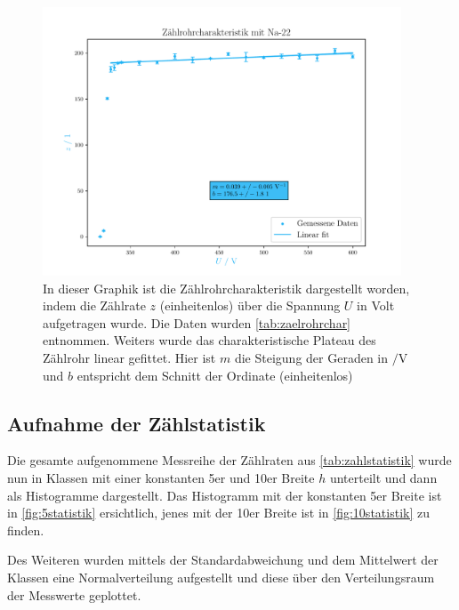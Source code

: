 \documentclass[12pt,english,ngerman]{scrartcl}
\begin{document}
\begin{figure}[H]
	\begin{center}
		\includegraphics[width = 0.95\textwidth]{figures/charakteristik.pdf}
	\end{center}
	\caption[Aufnahme der Zählrohrcharakteristik bei  Probe mit
		linearem Fit]{In dieser Graphik ist die Zählrohrcharakteristik dargestellt
		worden, indem die Zählrate $z$ (einheitenlos) über die Spannung $U$
		in Volt aufgetragen wurde. Die
		Daten wurden \autoref{tab:zaelrohrchar} entnommen. Weiters wurde das
		charakteristische Plateau des Zählrohr linear gefittet. Hier ist $m$ die
		Steigung der Geraden in $\si{\per\volt}$
		und $b$ entspricht dem Schnitt der Ordinate (einheitenlos)}\label{fig:zaelrohrchar}
\end{figure}

\subsection{Aufnahme der Zählstatistik}

Die gesamte aufgenommene Messreihe der Zählraten aus
\autoref{tab:zahlstatistik} wurde nun in Klassen mit einer konstanten 5er und
10er Breite $h$ unterteilt und dann als Histogramme dargestellt. Das Histogramm
mit der konstanten 5er Breite ist in \autoref{fig:5statistik} ersichtlich,
jenes mit der 10er Breite ist in \autoref{fig:10statistik} zu finden.

Des Weiteren wurden mittels der Standardabweichung und dem Mittelwert der
Klassen eine Normalverteilung aufgestellt und diese über den Verteilungsraum
der Messwerte geplottet.
\end{document}
